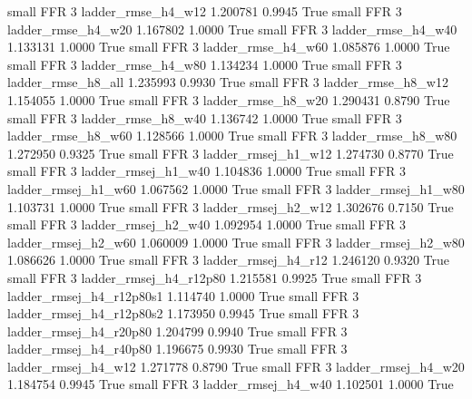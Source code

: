      small      FFR                 3       ladder_rmse_h4_w12   1.200781      0.9945    True
     small      FFR                 3       ladder_rmse_h4_w20   1.167802      1.0000    True
     small      FFR                 3       ladder_rmse_h4_w40   1.133131      1.0000    True
     small      FFR                 3       ladder_rmse_h4_w60   1.085876      1.0000    True
     small      FFR                 3       ladder_rmse_h4_w80   1.134234      1.0000    True
     small      FFR                 3       ladder_rmse_h8_all   1.235993      0.9930    True
     small      FFR                 3       ladder_rmse_h8_w12   1.154055      1.0000    True
     small      FFR                 3       ladder_rmse_h8_w20   1.290431      0.8790    True
     small      FFR                 3       ladder_rmse_h8_w40   1.136742      1.0000    True
     small      FFR                 3       ladder_rmse_h8_w60   1.128566      1.0000    True
     small      FFR                 3       ladder_rmse_h8_w80   1.272950      0.9325    True
     small      FFR                 3      ladder_rmsej_h1_w12   1.274730      0.8770    True
     small      FFR                 3      ladder_rmsej_h1_w40   1.104836      1.0000    True
     small      FFR                 3      ladder_rmsej_h1_w60   1.067562      1.0000    True
     small      FFR                 3      ladder_rmsej_h1_w80   1.103731      1.0000    True
     small      FFR                 3      ladder_rmsej_h2_w12   1.302676      0.7150    True
     small      FFR                 3      ladder_rmsej_h2_w40   1.092954      1.0000    True
     small      FFR                 3      ladder_rmsej_h2_w60   1.060009      1.0000    True
     small      FFR                 3      ladder_rmsej_h2_w80   1.086626      1.0000    True
     small      FFR                 3      ladder_rmsej_h4_r12   1.246120      0.9320    True
     small      FFR                 3   ladder_rmsej_h4_r12p80   1.215581      0.9925    True
     small      FFR                 3 ladder_rmsej_h4_r12p80s1   1.114740      1.0000    True
     small      FFR                 3 ladder_rmsej_h4_r12p80s2   1.173950      0.9945    True
     small      FFR                 3   ladder_rmsej_h4_r20p80   1.204799      0.9940    True
     small      FFR                 3   ladder_rmsej_h4_r40p80   1.196675      0.9930    True
     small      FFR                 3      ladder_rmsej_h4_w12   1.271778      0.8790    True
     small      FFR                 3      ladder_rmsej_h4_w20   1.184754      0.9945    True
     small      FFR                 3      ladder_rmsej_h4_w40   1.102501      1.0000    True
